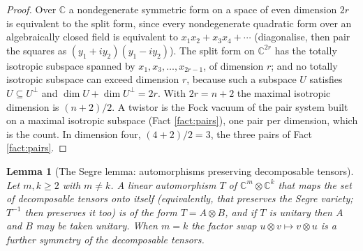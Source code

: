 \documentclass[11pt]{article}
\newtheorem{lemma}[theorem]{Lemma}
\theoremstyle{definition}
\newcommand{\C}{\mathbb{C}}
\begin{document}
\begin{proof}
Over $\C$ a nondegenerate symmetric form on a space of even dimension $2r$ is equivalent to the split form, since every nondegenerate quadratic form over an algebraically closed field is equivalent to $x_{1}x_{2} + x_{3}x_{4} + \cdots$ (diagonalise, then pair the squares as $(y_{1} + iy_{2})(y_{1} - iy_{2})$). The split form on $\C^{2r}$ has the totally isotropic subspace spanned by $x_{1}, x_{3}, \ldots, x_{2r-1}$, of dimension $r$; and no totally isotropic subspace can exceed dimension $r$, because such a subspace $U$ satisfies $U \subseteq U^{\perp}$ and $\dim U + \dim U^{\perp} = 2r$. With $2r = n + 2$ the maximal isotropic dimension is $(n+2)/2$. A twistor is the Fock vacuum of the pair system built on a maximal isotropic subspace (Fact \ref{fact:pairs}), one pair per dimension, which is the count. In dimension four, $(4+2)/2 = 3$, the three pairs of Fact \ref{fact:pairs}.
\end{proof}

\begin{lemma}[The Segre lemma: automorphisms preserving decomposable tensors]\label{lem:segre}
Let $m, k \ge 2$ with $m \neq k$. A linear automorphism $T$ of $\C^{m} \otimes \C^{k}$ that maps the set of decomposable tensors onto itself (equivalently, that preserves the Segre variety; $T^{-1}$ then preserves it too) is of the form $T = A \otimes B$, and if $T$ is unitary then $A$ and $B$ may be taken unitary. When $m = k$ the factor swap $u \otimes v \mapsto v \otimes u$ is a further symmetry of the decomposable tensors.
\end{lemma}
\end{document}

